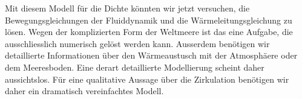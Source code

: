 Mit diesem Modell für die Dichte könnten wir jetzt versuchen, die
Bewegungsgleichungen der Fluiddynamik und die Wärmeleitungsgleichung
zu lösen.
Wegen der komplizierten Form der Weltmeere ist das eine Aufgabe,
die ausschliesslich numerisch gelöst werden kann.
Ausserdem benötigen wir detaillierte Informationen über den Wärmeaustusch
mit der Atmosphäere oder dem Meeresboden.
Eine derart detaillierte Modellierung scheint daher aussichtslos.
Für eine qualitative Aussage über die Zirkulation benötigen wir daher
ein dramatisch vereinfachtes Modell.





